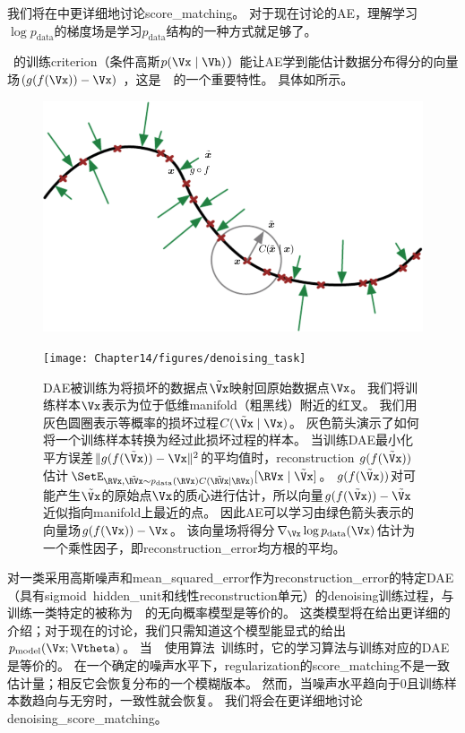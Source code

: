我们将在中更详细地讨论\gls{score_matching}。
对于现在讨论的\gls{AE}，理解学习$\log p_{\text{data}}$的梯度场是学习$p_{\text{data}}$结构的一种方式就足够了。


~的训练\gls{criterion}（条件高斯$p(\Vx \mid \Vh)$）能让\gls{AE}学到能估计数据分布得分的向量场$(g(f(\Vx))-\Vx)$ ，这是~~的一个重要特性。
具体如所示。

\begin{figure}[!htb]
\ifOpenSource
\centerline{\includegraphics[scale=0.5]{images/121.png}}
\else
\centerline{\texttt{[image: Chapter14/figures/denoising\_task]}}
\fi
\caption{\gls{DAE}被训练为将损坏的数据点$\tilde \Vx$映射回原始数据点$\Vx$。
我们将训练样本$\Vx$表示为位于低维\gls{manifold}（粗黑线）附近的红叉。
我们用灰色圆圈表示等概率的损坏过程$C(\tilde \Vx \mid \Vx)$。
灰色箭头演示了如何将一个训练样本转换为经过此损坏过程的样本。
当训练\gls{DAE}最小化平方误差$\| g(f(\tilde \Vx)) - \Vx \|^2$的平均值时，\gls{reconstruction} $g(f(\tilde \Vx))$估计$\SetE_{\RVx, \tilde{\RVx} \sim p_{\text{data}}(\RVx) C(\tilde{\RVx} \mid \RVx)}[\RVx \mid \tilde{\Vx}]$。
$g(f(\tilde \Vx))$对可能产生$\tilde \Vx$的原始点$\Vx$的质心进行估计，所以向量$ g(f(\tilde \Vx)) - \tilde \Vx $近似指向\gls{manifold}上最近的点。
因此\gls{AE}可以学习由绿色箭头表示的向量场$ g(f( \Vx)) -  \Vx $。
该向量场将得分$\nabla_{\Vx} \log p_{\text{data}}(\Vx)$估计为一个乘性因子，即\gls{reconstruction_error}均方根的平均。
}
\label{fig:chap14_denoising_task}
\end{figure}

对一类采用高斯噪声和\gls{mean_squared_error}作为\gls{reconstruction_error}的特定\gls{DAE}（具有sigmoid~\gls{hidden_unit}和线性\gls{reconstruction}单元）的\gls{denoising}训练过程，与训练一类特定的被称为~~的无向概率模型是等价的\citep{Vincent-NC-2011-small}。
这类模型将在给出更详细的介绍；对于现在的讨论，我们只需知道这个模型能显式的给出$p_{\text{model}}(\Vx; \Vtheta)$。
当~~使用算法~\citep{Kingma+LeCun-2010-small}训练时，它的学习算法与训练对应的\gls{DAE}是等价的。
在一个确定的噪声水平下，\gls{regularization}的\gls{score_matching}不是一致估计量；相反它会恢复分布的一个模糊版本。
然而，当噪声水平趋向于0且训练样本数趋向与无穷时，一致性就会恢复。
我们将会在更详细地讨论\gls{denoising_score_matching}。



